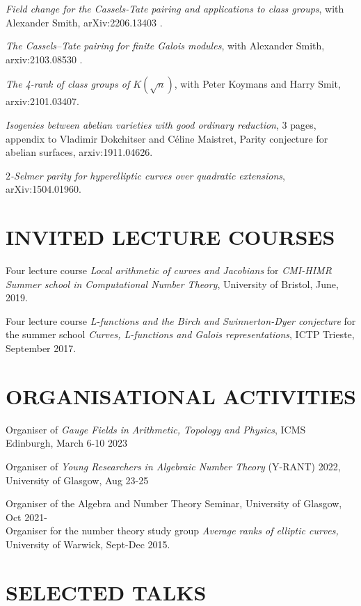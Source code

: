 \documentclass{res}
\begin{document}
\begin{resume}
{\it Field change for the Cassels-Tate pairing and applications to class groups}, with Alexander Smith, arXiv:2206.13403 . \

{\it The Cassels--Tate pairing for finite Galois modules}, with Alexander Smith, arxiv:2103.08530 . \

{\it The 4-rank of class groups of $K(\sqrt{n}) $}, with Peter Koymans and Harry Smit, arxiv:2101.03407. \

{\it Isogenies between abelian varieties with good ordinary reduction}, 3 pages, appendix to  Vladimir Dokchitser and C\'{e}line Maistret, {Parity conjecture for abelian surfaces},  arxiv:1911.04626. \

{\it $2$-Selmer parity for hyperelliptic curves over quadratic extensions},  arXiv:1504.01960.\


\section{INVITED LECTURE COURSES}

\bigskip
\vspace{-0.1in}
Four lecture course {\it Local arithmetic of curves and Jacobians} for {\it CMI-HIMR Summer school in Computational Number Theory}, University of Bristol, June, 2019.

Four lecture course {\it L-functions and the Birch and Swinnerton-Dyer conjecture} for the summer school {\it Curves, L-functions and Galois representations}, ICTP Trieste, September 2017.\

 \section{ORGANISATIONAL ACTIVITIES}
 
 \medskip
 
 \textup{Organiser of \textit{Gauge Fields in Arithmetic, Topology and Physics}},   \textup{ICMS Edinburgh, March 6-10 2023}  
 
\textup{Organiser of \textit{Young Researchers in Algebraic Number Theory} (Y-RANT) 2022},   \textup{University of Glasgow, Aug 23-25}  
 
\textup{Organiser of the  Algebra and Number Theory Seminar, }   \textup{University of Glasgow, Oct 2021-}\medskip\\
\textup{Organiser for the number theory study group} {\it Average ranks of elliptic curves,} \textup{University of Warwick, Sept-Dec 2015.} 

\section{SELECTED TALKS}         
        

\end{resume}
\end{document}
